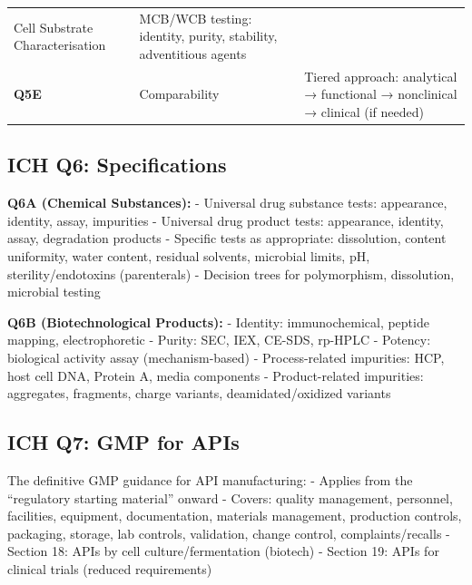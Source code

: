 \documentclass[
  11pt,
  a4paper,
]{report}
\begin{document}
\begin{longtable}[]{@{}lll@{}}
\begin{minipage}[t]{0.21\columnwidth}
Cell Substrate Characterisation\strut
\end{minipage} & \begin{minipage}[t]{0.38\columnwidth}\raggedright
MCB/WCB testing: identity, purity, stability, adventitious agents\strut
\end{minipage}\tabularnewline
\begin{minipage}[t]{0.32\columnwidth}\raggedright
\textbf{Q5E}\strut
\end{minipage} & \begin{minipage}[t]{0.21\columnwidth}\raggedright
Comparability\strut
\end{minipage} & \begin{minipage}[t]{0.38\columnwidth}\raggedright
Tiered approach: analytical → functional → nonclinical → clinical (if
needed)\strut
\end{minipage}\tabularnewline
\bottomrule
\end{longtable}

\hypertarget{ich-q6-specifications}{%
\subsection{ICH Q6: Specifications}\label{ich-q6-specifications}}

\textbf{Q6A (Chemical Substances):} - Universal drug substance tests:
appearance, identity, assay, impurities - Universal drug product tests:
appearance, identity, assay, degradation products - Specific tests as
appropriate: dissolution, content uniformity, water content, residual
solvents, microbial limits, pH, sterility/endotoxins (parenterals) -
Decision trees for polymorphism, dissolution, microbial testing

\textbf{Q6B (Biotechnological Products):} - Identity: immunochemical,
peptide mapping, electrophoretic - Purity: SEC, IEX, CE-SDS, rp-HPLC -
Potency: biological activity assay (mechanism-based) - Process-related
impurities: HCP, host cell DNA, Protein A, media components -
Product-related impurities: aggregates, fragments, charge variants,
deamidated/oxidized variants

\hypertarget{ich-q7-gmp-for-apis}{%
\subsection{ICH Q7: GMP for APIs}\label{ich-q7-gmp-for-apis}}

The definitive GMP guidance for API manufacturing: - Applies from the
``regulatory starting material'' onward - Covers: quality management,
personnel, facilities, equipment, documentation, materials management,
production controls, packaging, storage, lab controls, validation,
change control, complaints/recalls - Section 18: APIs by cell
culture/fermentation (biotech) - Section 19: APIs for clinical trials
(reduced requirements)
\end{document}
